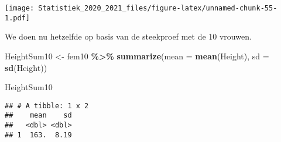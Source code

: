 \documentclass[
  12pt,dutch,coursenotes]{book}
\newenvironment{Shaded}{\begin{snugshade}}{\end{snugshade}}
\newcommand{\DataTypeTok}[1]{\textcolor[rgb]{0.13,0.29,0.53}{#1}}
\newcommand{\DecValTok}[1]{\textcolor[rgb]{0.00,0.00,0.81}{#1}}
\newcommand{\KeywordTok}[1]{\textcolor[rgb]{0.13,0.29,0.53}{\textbf{#1}}}
\newcommand{\NormalTok}[1]{#1}
\newcommand{\OperatorTok}[1]{\textcolor[rgb]{0.81,0.36,0.00}{\textbf{#1}}}
\newcommand{\StringTok}[1]{\textcolor[rgb]{0.31,0.60,0.02}{#1}}
\theoremstyle{definition}
\theoremstyle{definition}
\theoremstyle{definition}
\theoremstyle{remark}
\begin{document}
\begin{Shaded}
\end{Shaded}

\texttt{[image: Statistiek\_2020\_2021\_files/figure-latex/unnamed-chunk-55-1.pdf]}

We doen nu hetzelfde op basis van de steekproef met de 10 vrouwen.

\begin{Shaded}
\begin{Highlighting}[]
\NormalTok{HeightSum10 \textless{}{-}}\StringTok{ }\NormalTok{fem10 }\OperatorTok{\%\textgreater{}\%}\StringTok{ }\KeywordTok{summarize}\NormalTok{(}\DataTypeTok{mean =} \KeywordTok{mean}\NormalTok{(Height), }
    \DataTypeTok{sd =} \KeywordTok{sd}\NormalTok{(Height))}

\NormalTok{HeightSum10}
\end{Highlighting}
\end{Shaded}

\begin{verbatim}
## # A tibble: 1 x 2
##    mean    sd
##   <dbl> <dbl>
## 1  163.  8.19
\end{verbatim}
\end{document}
